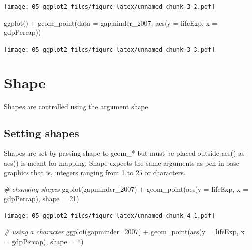 \documentclass[
]{book}
\newenvironment{Shaded}{\begin{snugshade}}{\end{snugshade}}
\newcommand{\AttributeTok}[1]{\textcolor[rgb]{0.77,0.63,0.00}{#1}}
\newcommand{\CommentTok}[1]{\textcolor[rgb]{0.56,0.35,0.01}{\textit{#1}}}
\newcommand{\DecValTok}[1]{\textcolor[rgb]{0.00,0.00,0.81}{#1}}
\newcommand{\FunctionTok}[1]{\textcolor[rgb]{0.00,0.00,0.00}{#1}}
\newcommand{\NormalTok}[1]{#1}
\newcommand{\SpecialCharTok}[1]{\textcolor[rgb]{0.00,0.00,0.00}{#1}}
\newcommand{\StringTok}[1]{\textcolor[rgb]{0.31,0.60,0.02}{#1}}
\begin{document}
\texttt{[image: 05-ggplot2\_files/figure-latex/unnamed-chunk-3-2.pdf]}

\begin{Shaded}
\begin{Highlighting}[]

\FunctionTok{ggplot}\NormalTok{() }\SpecialCharTok{+} 
  \FunctionTok{geom\_point}\NormalTok{(}\AttributeTok{data =}\NormalTok{ gapminder\_2007, }\FunctionTok{aes}\NormalTok{(}\AttributeTok{y =}\NormalTok{ lifeExp, }\AttributeTok{x =}\NormalTok{ gdpPercap))}
\end{Highlighting}
\end{Shaded}

\texttt{[image: 05-ggplot2\_files/figure-latex/unnamed-chunk-3-3.pdf]}

\hypertarget{shape}{%
\section{Shape}\label{shape}}

Shapes are controlled using the argument shape.

\hypertarget{setting-shapes}{%
\subsection{Setting shapes}\label{setting-shapes}}

Shapes are set by passing shape to geom\_* but must be placed outside aes() as aes() is meant for mapping. Shape expects the same arguments as pch in base graphics that is, integers ranging from 1 to 25 or characters.

\begin{Shaded}
\begin{Highlighting}[]
\CommentTok{\# changing shapes}
\FunctionTok{ggplot}\NormalTok{(gapminder\_2007) }\SpecialCharTok{+} 
  \FunctionTok{geom\_point}\NormalTok{(}\FunctionTok{aes}\NormalTok{(}\AttributeTok{y =}\NormalTok{ lifeExp, }\AttributeTok{x =}\NormalTok{ gdpPercap), }\AttributeTok{shape =} \DecValTok{21}\NormalTok{)}
\end{Highlighting}
\end{Shaded}

\texttt{[image: 05-ggplot2\_files/figure-latex/unnamed-chunk-4-1.pdf]}

\begin{Shaded}
\begin{Highlighting}[]
\CommentTok{\# using a character}
\FunctionTok{ggplot}\NormalTok{(gapminder\_2007) }\SpecialCharTok{+} 
  \FunctionTok{geom\_point}\NormalTok{(}\FunctionTok{aes}\NormalTok{(}\AttributeTok{y =}\NormalTok{ lifeExp, }\AttributeTok{x =}\NormalTok{ gdpPercap), }\AttributeTok{shape =} \StringTok{\textquotesingle{}*\textquotesingle{}}\NormalTok{)}
\end{Highlighting}
\end{Shaded}
\end{document}
